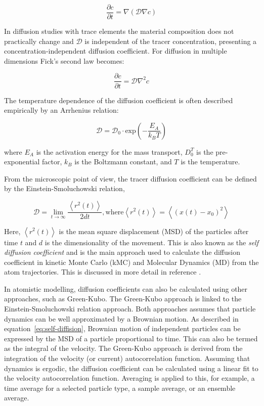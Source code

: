 \documentclass[../main.tex]{subfiles}
\begin{document}
\begin{equation}
    \label{eq:ficksecond}
    \frac{\partial c}{\partial t} = \nabla (\mathcal{D} \nabla c )
\end{equation}

In diffusion studies with trace elements the material composition does not practically change and $\mathcal{D}$ is independent of the tracer concentration, presenting a concentration-independent diffusion coefficient. For diffusion in multiple dimensions Fick's second law becomes: \cite{crank1979mathematics}

\begin{equation}
    \frac{\partial c}{\partial t} = \mathcal{D} \nabla^2 c
    \label{eq:nodirectional_diffusion}
\end{equation}

The temperature dependence of the diffusion coefficient is often described empirically by an Arrhenius relation:

\begin{equation}
    \mathcal{D} = \mathcal{D}_0 \cdot \textrm{exp} \left (- \frac{E_A}{k_B T} \right )
\end{equation}

where $E_A$ is the activation energy for the mass transport, $D_0^T$ is the pre-exponential factor, $k_B$ is the Boltzmann constant, and $T$ is the temperature.

From the microscopic point of view, the tracer diffusion coefficient can be defined by the Einstein-Smoluchowski relation, \cite{einstein1905presumed,von1906kinetischen}

\begin{equation}
    \mathcal{D} = \lim_{t\to\infty} \frac{\left <r^2(t)\right >}{2dt}, \mathrm{where} \left <r^2(t)\right > = \left< \left(x(t) - x_0 \right)^2 \right>
    \label{eq:self-diffision}
\end{equation}

Here, $\left <r^2(t)\right >$ is the mean square displacement (MSD) of the particles after time $t$ and $d$ is the dimensionality of the movement. This is also known as the \textit{self diffusion coefficient} and is the main approach used to calculate the diffusion coefficient in kinetic Monte Carlo (kMC) and Molecular Dynamics (MD) from the atom trajectories. This is discussed in more detail in reference .

In atomistic modelling, diffusion coefficients can also be calculated using other approaches, such as Green-Kubo. The Green-Kubo approach is linked to the Einstein-Smoluchowski relation approach. Both approaches assumes that particle dynamics can be well approximated by a Brownian motion. As described in equation~\ref{eq:self-diffision}, Brownian motion of independent particles can be expressed by the MSD of a particle proportional to time. This can also be termed as the integral of the velocity. The Green-Kubo approach is derived from the integration of the velocity (or current) autocorrelation function. Assuming that dynamics is ergodic, the diffusion coefficient can be calculated using a linear fit to the velocity autocorrelation function. Averaging is applied to this, for example, a time  average for a selected particle type, a sample average, or an ensemble average.
\end{document}
